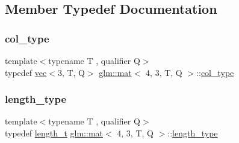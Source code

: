 \subsection{Member Typedef Documentation}
\mbox{\label{structglm_1_1mat_3_014_00_013_00_01_t_00_01_q_01_4_ab7cb76d6290691108c8af724270e3b6c}} 
\subsubsection{\texorpdfstring{col\+\_\+type}{col\_type}}
{\footnotesize\ttfamily template$<$typename T , qualifier Q$>$ \\
typedef \mbox{\hyperlink{structglm_1_1vec}{vec}}$<$3, T, Q$>$ \mbox{\hyperlink{structglm_1_1mat}{glm\+::mat}}$<$ 4, 3, T, Q $>$\+::\mbox{\hyperlink{structglm_1_1mat_3_014_00_013_00_01_t_00_01_q_01_4_ab7cb76d6290691108c8af724270e3b6c}{col\+\_\+type}}}

\mbox{\label{structglm_1_1mat_3_014_00_013_00_01_t_00_01_q_01_4_a24f0f2085bebe0a6e79da267368e74f5}} 
\subsubsection{\texorpdfstring{length\+\_\+type}{length\_type}}
{\footnotesize\ttfamily template$<$typename T , qualifier Q$>$ \\
typedef \mbox{\hyperlink{namespaceglm_a090a0de2260835bee80e71a702492ed9}{length\+\_\+t}} \mbox{\hyperlink{structglm_1_1mat}{glm\+::mat}}$<$ 4, 3, T, Q $>$\+::\mbox{\hyperlink{structglm_1_1mat_3_014_00_013_00_01_t_00_01_q_01_4_a24f0f2085bebe0a6e79da267368e74f5}{length\+\_\+type}}}

\mbox{\label{structglm_1_1mat_3_014_00_013_00_01_t_00_01_q_01_4_ab68daf8d119fa525c762d6ba0bc08538}} 
